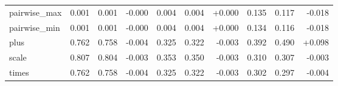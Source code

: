 \begin{table}[H]
\begin{tabular}{l | r r r | r r r | r r r}
  pairwise\_max & 0.001 & 0.001 & -0.000 & 0.004 & 0.004 & +0.000 & 0.135 & 0.117 & -0.018 \\
  pairwise\_min & 0.001 & 0.001 & -0.000 & 0.004 & 0.004 & +0.000 & 0.134 & 0.116 & -0.018 \\
  plus & 0.762 & 0.758 & -0.004 & 0.325 & 0.322 & -0.003 & 0.392 & 0.490 & +0.098 \\
  scale & 0.807 & 0.804 & -0.003 & 0.353 & 0.350 & -0.003 & 0.310 & 0.307 & -0.003 \\
  times & 0.762 & 0.758 & -0.004 & 0.325 & 0.322 & -0.003 & 0.302 & 0.297 & -0.004 \\
\bottomrule
\end{tabular}
\end{table}
